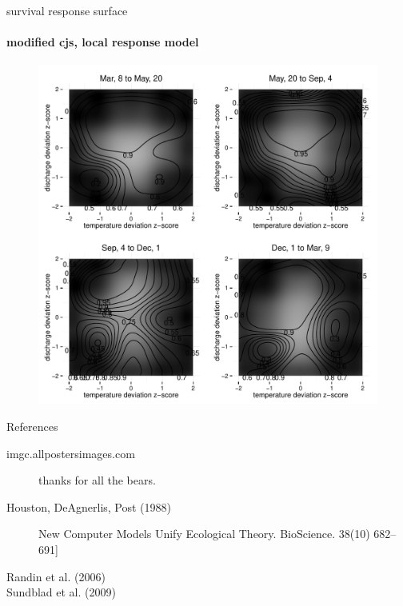 \documentclass[show notes]{beamer}
\begin{document}
\begin{frame}{survival response surface}
  \framesubtitle{modified cjs, local response model}

	\begin{figure}
	\includegraphics[clip, trim=0 0 0 35, height=.8\textheight]{donut-environmental-effect-on-survival-wu.pdf}
  	\end{figure}

\end{frame}



\begin{frame}{References}

    \begin{description}
    \item [imgc.allpostersimages.com] thanks for all the bears.
    \item [Houston, DeAgnerlis, Post (1988)] New Computer Models Unify Ecological Theory. BioScience. 38(10) 682--691]
    \item [Randin et al. (2006)] 
    \item [Sundblad et al. (2009)] 
    \end{description}


\end{frame}
\end{document}
